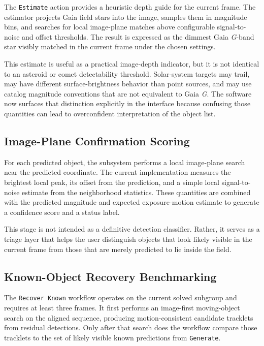 \documentclass[modern]{aastex701}
\begin{document}
The \texttt{Estimate} action provides a heuristic depth guide for the current frame. The estimator projects Gaia field stars into the image, samples them in magnitude bins, and searches for local image-plane matches above configurable signal-to-noise and offset thresholds. The result is expressed as the dimmest Gaia \emph{G}-band star visibly matched in the current frame under the chosen settings.

This estimate is useful as a practical image-depth indicator, but it is not identical to an asteroid or comet detectability threshold. Solar-system targets may trail, may have different surface-brightness behavior than point sources, and may use catalog magnitude conventions that are not equivalent to Gaia \emph{G}. The software now surfaces that distinction explicitly in the interface because confusing those quantities can lead to overconfident interpretation of the object list.

\subsection{Image-Plane Confirmation Scoring}\label{subsec:confirmation}

For each predicted object, the subsystem performs a local image-plane search near the predicted coordinate. The current implementation measures the brightest local peak, its offset from the prediction, and a simple local signal-to-noise estimate from the neighborhood statistics. These quantities are combined with the predicted magnitude and expected exposure-motion estimate to generate a confidence score and a status label.

This stage is not intended as a definitive detection classifier. Rather, it serves as a triage layer that helps the user distinguish objects that look likely visible in the current frame from those that are merely predicted to lie inside the field.

\subsection{Known-Object Recovery Benchmarking}\label{subsec:recover}

The \texttt{Recover Known} workflow operates on the current solved subgroup and requires at least three frames. It first performs an image-first moving-object search on the aligned sequence, producing motion-consistent candidate tracklets from residual detections. Only after that search does the workflow compare those tracklets to the set of likely visible known predictions from \texttt{Generate}.
\end{document}
